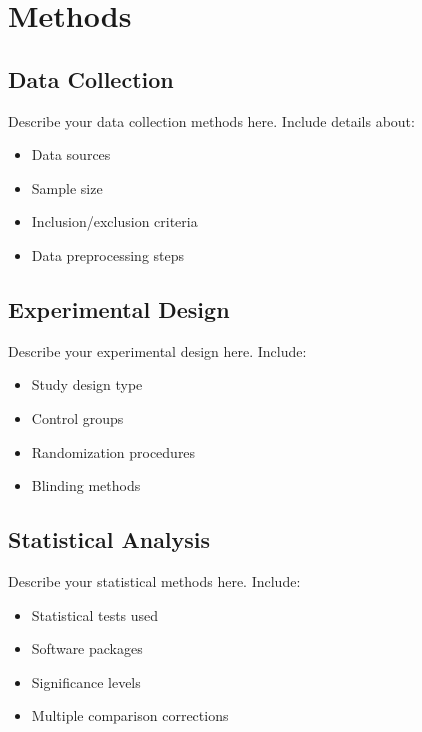 
\section{Methods}

\subsection{Data Collection}

Describe your data collection methods here. Include details about:
\begin{itemize}
\item Data sources
\item Sample size
\item Inclusion/exclusion criteria
\item Data preprocessing steps
\end{itemize}

\subsection{Experimental Design}

Describe your experimental design here. Include:
\begin{itemize}
\item Study design type
\item Control groups
\item Randomization procedures
\item Blinding methods
\end{itemize}

\subsection{Statistical Analysis}

Describe your statistical methods here. Include:
\begin{itemize}
\item Statistical tests used
\item Software packages
\item Significance levels
\item Multiple comparison corrections
\end{itemize}

